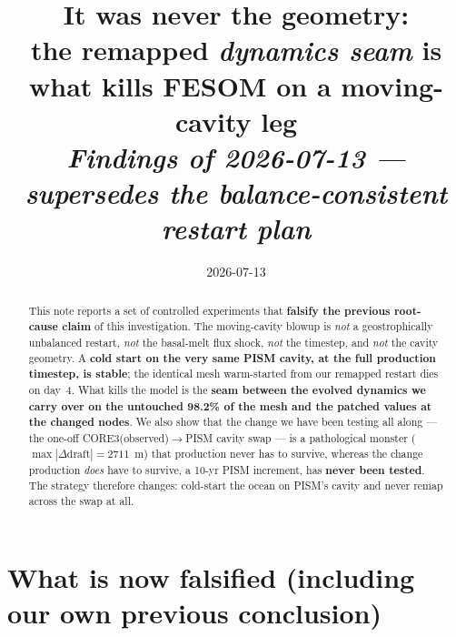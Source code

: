 \documentclass[11pt,a4paper]{article}
\title{\vspace{-1.5em}\textbf{It was never the geometry:}\\[0.2em]
       \large the remapped \emph{dynamics seam} is what kills FESOM on a moving-cavity leg\\[0.3em]
       \normalsize\textit{Findings of 2026-07-13 --- supersedes the balance-consistent restart plan}}
\author{}
\date{2026-07-13}
\begin{document}
\maketitle
\vspace{-2em}

\begin{center}\end{center}

\begin{abstract}
\noindent
This note reports a set of controlled experiments that \textbf{falsify the previous root-cause
claim} of this investigation. The moving-cavity blowup is \emph{not} a geostrophically
unbalanced restart, \emph{not} the basal-melt flux shock, \emph{not} the timestep, and
\emph{not} the cavity geometry. A \textbf{cold start on the very same PISM cavity, at the full
production timestep, is stable}; the identical mesh warm-started from our remapped restart dies
on day~4. What kills the model is the \textbf{seam between the evolved dynamics we carry over
on the untouched 98.2\% of the mesh and the patched values at the changed nodes}. We also show
that the change we have been testing all along --- the one-off CORE3(observed)$\to$PISM cavity
swap --- is a pathological monster ($\max|\Delta\mathrm{draft}| = 2711$~m) that production never
has to survive, whereas the change production \emph{does} have to survive, a 10-yr PISM
increment, has \textbf{never been tested}. The strategy therefore changes: cold-start the ocean
on PISM's cavity and never remap across the swap at all.
\end{abstract}

\section{What is now falsified (including our own previous conclusion)}
\end{document}
